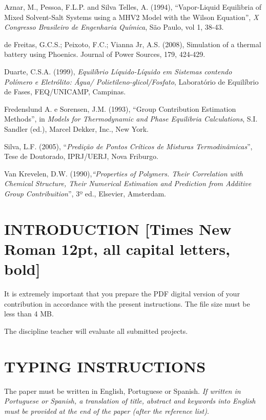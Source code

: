 \documentclass[12pt,fleqn]{article}
\begin{document}
\begin{thebibliography}{99}
  \fontsize{11}{0}\selectfont
  Aznar, M., Pessoa, F.L.P. and Silva Telles, A. (1994), ``Vapor-Liquid Equilibria of Mixed Solvent-Salt Systems using a MHV2 Model with the Wilson Equation'', {\em X Congresso Brasileiro de Engenharia Química}, São Paulo, vol 1, 38-43.
  
  de Freitas, G.C.S.; Peixoto, F.C.; Vianna Jr, A.S. (2008), Simulation of a thermal battery using Phoenics. Journal of Power Sources, 179, 424-429. 
  
  Duarte, C.S.A. (1999), {\em Equilíbrio Líquido-Líquido em Sistemas contendo Polímero e Eletrólito: Água/ Polietileno-glicol/Fosfato}, Laboratório de Equilíbrio de Fases, FEQ/UNICAMP, Campinas.
  
  Fredenslund A. e Sorensen, J.M. (1993), ``Group Contribution Estimation Methods'', in {\em  Models for Thermodynamic and Phase Equilibria Calculations}, S.I. Sandler (ed.), Marcel Dekker, Inc., New York.
  
  Silva, L.F. (2005), ``{\em Predição de Pontos Críticos de Misturas Termodinâmicas}'', Tese de Doutorado, IPRJ/UERJ, Nova Friburgo.
  
  Van Krevelen, D.W. (1990),{\em ``Properties of Polymers. Their Correlation with Chemical Structure, Their Numerical Estimation and Prediction from Additive Group Contribuition}'', 3º ed., Elsevier, Amsterdam.
  \end{thebibliography}



\newpage

\section{INTRODUCTION [Times New Roman 12pt, all capital letters, bold]}
It is extremely important that you prepare the PDF digital version of your contribution in accordance with the present instructions. The file size must be less than 4 MB.

The discipline teacher will evaluate all submitted projects.


\section{TYPING INSTRUCTIONS}
The paper must be written in English, Portuguese or Spanish. {\it If written in Portuguese or Spanish, a translation of title, abstract and keywords into English must be provided at the end of the paper (after the reference list)}.
\end{document}
